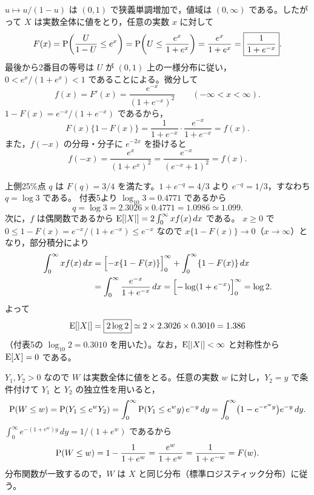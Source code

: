 \documentclass[a4paper,11pt]{ltjsarticle}
\begin{document}
\setlength{\abovedisplayskip}{6pt plus 2pt minus 2pt}
\setlength{\belowdisplayskip}{6pt plus 2pt minus 2pt}

$u\mapsto u/(1-u)$ は $(0,1)$ で狭義単調増加で，値域は $(0,\infty)$ である。したがって $X$ は実数全体に値をとり，任意の実数 $x$ に対して
\[
F(x)=\operatorname{P}\!\left(\frac{U}{1-U}\le e^x\right)=\operatorname{P}\!\left(U\le\frac{e^x}{1+e^x}\right)
=\frac{e^x}{1+e^x}=\boxed{\frac{1}{1+e^{-x}}}.
\]
最後から2番目の等号は $U$ が $(0,1)$ 上の一様分布に従い，$0<e^x/(1+e^x)<1$ であることによる。微分して
\[
f(x)=F'(x)=\boxed{\frac{e^{-x}}{(1+e^{-x})^2}}\qquad(-\infty<x<\infty).
\]
$1-F(x)=e^{-x}/(1+e^{-x})$ であるから，
\[
F(x)\{1-F(x)\}=\frac{1}{1+e^{-x}}\cdot\frac{e^{-x}}{1+e^{-x}}=f(x).
\]
また，$f(-x)$ の分母・分子に $e^{-2x}$ を掛けると
\[
f(-x)=\frac{e^{x}}{(1+e^{x})^2}=\frac{e^{-x}}{(e^{-x}+1)^2}=f(x).
\]

上側25\%点 $q$ は $F(q)=3/4$ を満たす。$1+e^{-q}=4/3$ より $e^{-q}=1/3$，すなわち $q=\log3$ である。
付表5より $\log_{10}3=0.4771$ であるから
\[
q=\log3=2.3026\times0.4771=1.0986\simeq\boxed{1.099}.
\]
次に，$f$ は偶関数であるから $\operatorname{E}[|X|]=2\int_0^\infty xf(x)\,dx$ である。
$x\ge0$ で $0\le1-F(x)=e^{-x}/(1+e^{-x})\le e^{-x}$ なので $x\{1-F(x)\}\to0$（$x\to\infty$）となり，部分積分により
\begin{align*}
\int_0^\infty xf(x)\,dx&=\Bigl[-x\{1-F(x)\}\Bigr]_0^\infty+\int_0^\infty\{1-F(x)\}\,dx\\
&=\int_0^\infty\frac{e^{-x}}{1+e^{-x}}\,dx
=\Bigl[-\log(1+e^{-x})\Bigr]_0^\infty=\log2 .
\end{align*}
よって
\[
\operatorname{E}[|X|]=\boxed{2\log2}\simeq2\times2.3026\times0.3010=1.386
\]
（付表5の $\log_{10}2=0.3010$ を用いた）。なお，$\operatorname{E}[|X|]<\infty$ と対称性から $\operatorname{E}[X]=0$ である。

$Y_1,Y_2>0$ なので $W$ は実数全体に値をとる。任意の実数 $w$ に対し，$Y_2=y$ で条件付けて $Y_1$ と $Y_2$ の独立性を用いると，
\[
\operatorname{P}(W\le w)=\operatorname{P}(Y_1\le e^wY_2)=\int_0^\infty\operatorname{P}(Y_1\le e^wy)\,e^{-y}\,dy
=\int_0^\infty\bigl(1-e^{-e^wy}\bigr)e^{-y}\,dy .
\]
$\int_0^\infty e^{-(1+e^w)y}\,dy=1/(1+e^w)$ であるから
\[
\operatorname{P}(W\le w)=1-\frac{1}{1+e^w}=\frac{e^w}{1+e^w}=\frac{1}{1+e^{-w}}=F(w).
\]
分布関数が一致するので，$W$ は $X$ と同じ分布（標準ロジスティック分布）に従う。
\end{document}
